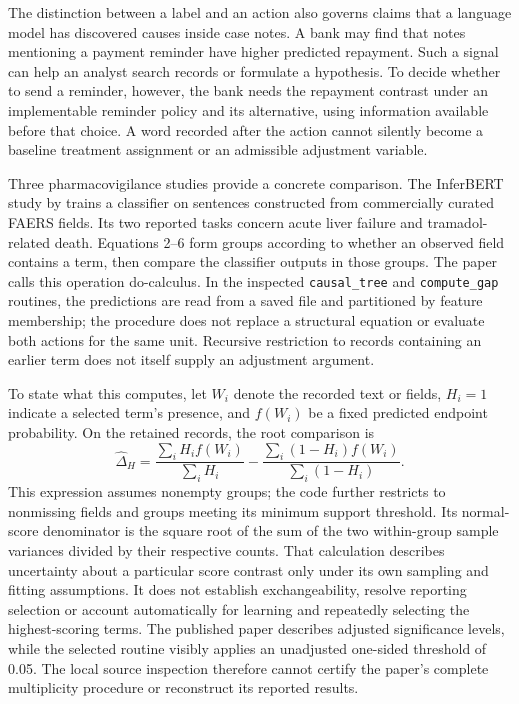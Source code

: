 The distinction between a label and an action also governs claims that a
language model has discovered causes inside case notes. A bank may find that
notes mentioning a payment reminder have higher predicted repayment. Such a
signal can help an analyst search records or formulate a hypothesis. To decide
whether to send a reminder, however, the bank needs the repayment contrast
under an implementable reminder policy and its alternative, using information
available before that choice. A word recorded after the action cannot silently
become a baseline treatment assignment or an admissible adjustment variable.

Three pharmacovigilance studies provide a concrete comparison.
The InferBERT study by \citet{rel66inferbert} trains a classifier on sentences constructed from
commercially curated FAERS fields. Its two reported tasks concern acute liver
failure and tramadol-related death. Equations 2--6 form groups according to
whether an observed field contains a term, then compare the classifier outputs
in those groups. The paper calls this operation do-calculus. In the inspected
\texttt{causal\_tree} and \texttt{compute\_gap} routines, the predictions are
read from a saved file and partitioned by feature membership; the procedure
does not replace a structural equation or evaluate both actions for the same
unit. Recursive restriction to records containing an earlier term does not
itself supply an adjustment argument. \citep{rel66inferbertcode}

To state what this computes, let $W_i$ denote the recorded text or fields,
$H_i=1$ indicate a selected term's presence, and $f(W_i)$ be a fixed predicted
endpoint probability. On the retained records, the root comparison is
\begin{equation}
 \widehat\Delta_H=
 \frac{\sum_i H_i f(W_i)}{\sum_i H_i}
 -\frac{\sum_i(1-H_i)f(W_i)}{\sum_i(1-H_i)}.
 \label{eq:rel66-score-gap}
\end{equation}
This expression assumes nonempty groups; the code further restricts to
nonmissing fields and groups meeting its minimum support threshold. Its
normal-score denominator is the square root of the sum of the two within-group
sample variances divided by their respective counts. That calculation describes uncertainty about a
particular score contrast only under its own sampling and fitting assumptions.
It does not establish exchangeability, resolve reporting selection or account
automatically for learning and repeatedly selecting the highest-scoring terms.
The published paper describes adjusted significance levels, while the selected
routine visibly applies an unadjusted one-sided threshold of 0.05. The local
source inspection therefore cannot certify the paper's complete multiplicity
procedure or reconstruct its reported results. \citep{rel66inferbert,rel66inferbertcode}

